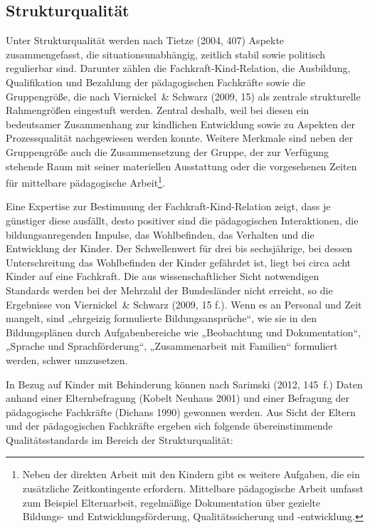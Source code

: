 \subsection{Strukturqualität}
\label{subsec:Strukturquali}
Unter Strukturqualität werden nach Tietze (2004, 407) Aspekte zusammengefasst, die situationsunabhängig, zeitlich stabil sowie politisch regulierbar sind. Darunter zählen die Fachkraft-Kind-Relation, die Ausbildung, Qualifikation und Bezahlung der pädagogischen Fachkräfte sowie die Gruppengröße, die nach Viernickel~\& Schwarz (2009, 15) als zentrale strukturelle Rahmengrößen eingestuft werden. Zentral deshalb, weil bei diesen ein bedeutsamer Zusammenhang zur kindlichen Entwicklung sowie zu Aspekten der Prozessqualität nachgewiesen werden konnte. Weitere Merkmale sind neben der Gruppengröße auch die Zusammensetzung der Gruppe, der zur Verfügung stehende Raum mit seiner materiellen Ausstattung oder die vorgesehenen Zeiten für mittelbare pädagogische Arbeit\footnote{Neben der direkten Arbeit mit den Kindern gibt es weitere Aufgaben, die ein zusätzliche Zeitkontingente erfordern. Mittelbare pädagogische Arbeit umfasst zum Beispiel Elternarbeit, regelmäßige Dokumentation über gezielte Bildungs- und Entwicklungsförderung, Qualitätssicherung und -entwicklung.}.

Eine Expertise zur Bestimmung der Fachkraft-Kind-Relation zeigt, dass je günstiger diese ausfällt, desto positiver sind die pädagogischen Interaktionen, die bildungsanregenden Impulse, das Wohlbefinden, das Verhalten und die Entwicklung der Kinder. Der Schwellenwert für drei bis sechsjährige, bei dessen Unterschreitung das Wohlbefinden der Kinder gefährdet ist, liegt bei circa acht Kinder auf eine Fachkraft. Die aus wissenschaftlicher Sicht notwendigen Standards werden bei der Mehrzahl der Bundesländer nicht erreicht, so die Ergebnisse von Viernickel~\& Schwarz (2009, 15 f.). Wenn es an Personal und Zeit mangelt, sind „ehrgeizig formulierte Bildungsansprüche“, wie sie in den Bildungsplänen durch Aufgabenbereiche wie „Beobachtung und Dokumentation“, „Sprache und Sprachförderung“, „Zusammenarbeit mit Familien“ formuliert werden, schwer umzusetzen.

In Bezug auf Kinder mit Behinderung können nach Sarimski (2012, 145~f.) Daten anhand einer Elternbefragung (Kobelt Neuhaus 2001) und einer Befragung der pädagogische Fachkräfte (Dichans 1990) gewonnen werden. Aus Sicht der Eltern und der pädagogischen Fachkräfte ergeben sich folgende übereinstimmende Qualitätsstandards im Bereich der Strukturqualität:
 
